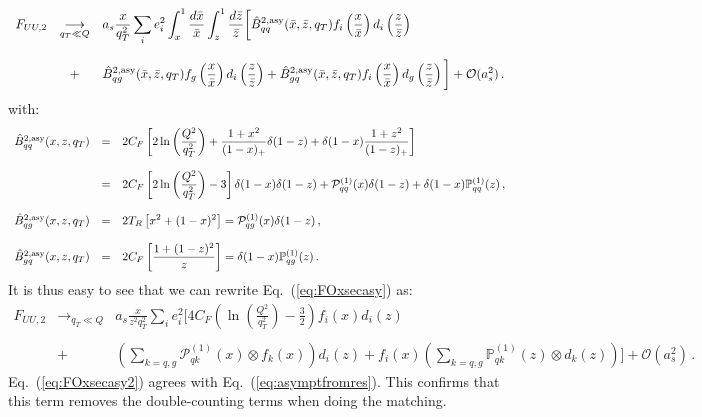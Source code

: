 \documentclass[10pt,a4paper]{article}
\begin{document}
\begin{equation}\label{eq:FOxsecasy}
\begin{array}{rcl}
  F_{UU,2}&\displaystyle \mathop{\longrightarrow}_{q_T\ll Q}&\displaystyle 
  a_s\frac{x}{q_T^2}\sum_{i}e_i^2\int_x^1\frac{d\bar{x}}{\bar{x}}\int_z^1\frac{d\bar{z}}{\bar{z}}\bigg[\hat{B}_{qq}^{2,
    \rm asy}(\bar{x},\bar{z},q_T)f_i\left(\frac{x}{\bar{x}}\right)
              d_i\left(\frac{z}{\bar{z}}\right)\\
\\
&+&\displaystyle \hat{B}_{qg}^{2,
    \rm asy}(\bar{x},\bar{z},q_T)f_g\left(\frac{x}{\bar{x}}\right)
              d_i\left(\frac{z}{\bar{z}}\right)+ \hat{B}_{gq}^{2,
    \rm asy}(\bar{x},\bar{z},q_T)f_i\left(\frac{x}{\bar{x}}\right)
              d_g\left(\frac{z}{\bar{z}}\right)\bigg]
+\mathcal{O}(a_s^2)\,.
\end{array}
\end{equation}
with:
\begin{equation}
\begin{array}{rcl}
  \hat{B}_{qq}^{2,\rm asy}(x,z,q_T) &=& \displaystyle  2C_F\left[2
                                        \ln\left(\frac{Q^2}{q_T^2}\right)+\frac{1+x^2}{(1-x)_+}\delta(1-z) +\delta(1-x)\frac{1+z^2}{(1-z)_+} \right]\\
  \\
                                    &=&\displaystyle 2C_F\left[2\ln\left(\frac{Q^2}{q_T^2}\right) -3\right]\delta(1-x) \delta(1-z)+\mathcal{P}_{qq}^{(1)}(x)\delta(1-z)
                                        +\delta(1-x) \mathbb{P}_{qq}^{(1)}(z)\,,\\
  \\
  \hat{B}_{qg}^{2,\rm asy}(x,z,q_T) &=& \displaystyle
                                        2T_R\left[x^2+(1-x)^2\right]=\mathcal{P}_{qg}^{(1)}(x)
                                        \delta(1-z)\,,\\
\\
  \hat{B}_{gq}^{2,\rm asy}(x,z,q_T) &=& \displaystyle  2C_F\left[\frac{1+(1-z)^2}{z}\right]=\delta(1-x)\mathbb{P}_{qg}^{(1)}(z)\,.
\end{array}
\end{equation}
It is thus easy to see that we can rewrite Eq.~(\ref{eq:FOxsecasy})
as:
\begin{equation}\label{eq:FOxsecasy2}
\begin{array}{rcl}
  F_{UU,2}&\displaystyle \mathop{\longrightarrow}_{q_T\ll Q}&\displaystyle 
  a_s\frac{x}{z^2q_T^2}\sum_{i}e_i^2 \Bigg[4C_F\left(\ln\left(\frac{Q^2}{q_T^2}\right) -\frac{3}{2}\right) f_i\left(x\right)
              d_i\left(z\right)\\
\\
&+&\displaystyle
    \left(\sum_{k=q,g}\mathcal{P}^{(1)}_{qk}(x)\otimes f_k\left(x\right) \right)
              d_i\left(z\right)+ f_i\left(x\right)
              \left(\sum_{k=q,g}\mathbb{P}^{(1)}_{qk}(z) \otimes d_k\left(z\right)\right)\Bigg]
+\mathcal{O}(a_s^2)\,.
\end{array}
\end{equation}
Eq.~(\ref{eq:FOxsecasy2}) agrees with
Eq.~(\ref{eq:asymptfromres}). This confirms that this term removes the
double-counting terms when doing the matching.
\end{document}
